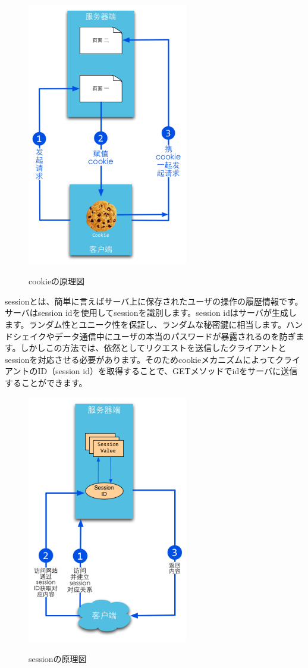 \begin{figure}[H]
   \includegraphics[width=7cm]{6.1.cookie2.png}
   \label{図6.1}
   \caption{cookieの原理図}
\end{figure}

sessionとは、簡単に言えばサーバ上に保存されたユーザの操作の履歴情報です。サーバはsession idを使用してsessionを識別します。session idはサーバが生成します。ランダム性とユニーク性を保証し、ランダムな秘密鍵に相当します。ハンドシェイクやデータ通信中にユーザの本当のパスワードが暴露されるのを防ぎます。しかしこの方法では、依然としてリクエストを送信したクライアントとsessionを対応させる必要があります。そのためcookieメカニズムによってクライアントのID（session id）を取得することで、GETメソッドでidをサーバに送信することができます。

\begin{figure}[H]
   \includegraphics[width=7cm]{6.1.session.png}
   \label{図6.2}
   \caption{sessionの原理図}
\end{figure}



